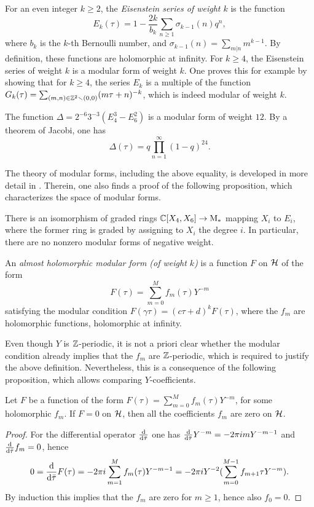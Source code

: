 \begin{expls}
 For an even integer $k\geq 2$, the \emph{Eisenstein series of weight $k$} is the function \[E_k(\tau)=1-\frac{2k}{b_k}\sum_{n\geq 1}\sigma_{k-1}(n)q^n,\] where $b_k$ is the $k$-th Bernoulli number, and $\sigma_{k-1}(n)=\sum_{m|n}m^{k-1}$. By definition, these functions are holomorphic at infinity. For $k\geq 4$, the Eisenstein series of weight $k$ is a modular form of weight $k$. One proves this for example by showing that for $k\geq 4$, the series $E_k$ is a multiple of the function $G_k(\tau)=\sum_{(m,n)\in\mathbb{Z}^2\smallsetminus(0,0)}(m\tau+n)^{-k}$, which is indeed modular of weight $k$.
 
 The function $\Delta=2^{-6}3^{-3}(E_4^3-E_6^2)$ is a modular form of weight $12$. By a theorem of Jacobi, one has \[\Delta(\tau)=q\prod_{n=1}^{\infty}(1-q)^{24}.\]
 
 The theory of modular forms, including the above equality, is developed in more  detail in \cite{Serre1973}. Therein, one also finds a proof of the following proposition, which characterizes the space of modular forms.
\end{expls}

\begin{prop}
 There is an isomorphism of graded rings $\mathbb{C}[X_4, X_6]\to \mathrm{M}_*$ mapping $X_i$ to $E_i$, where the former ring is graded by assigning to $X_i$ the degree $i$. In particular, there are no nonzero modular forms of negative weight.
\end{prop}

\begin{defi}
 An \emph{almost holomorphic modular form (of weight $k$)} is a function $F$ on $\mathcal{H}$ of the form
 \[F(\tau)=\sum_{m=0}^Mf_m(\tau)Y^{-m}\]
 satisfying the modular condition $F(\gamma\tau)=(c\tau+d)^kF(\tau)$, where the $f_m$ are holomorphic functions, holomorphic at infinity.
\end{defi}

Even though $Y$ is $\mathbb{Z}$-periodic, it is not a priori clear whether the modular condition already implies that the $f_m$ are $\mathbb{Z}$-periodic, which is required to justify the above definition. Nevertheless, this is a consequence of the following proposition, which allows comparing $Y$-coefficients.

\begin{prop}
 Let $F$ be a function of the form $F(\tau)=\sum_{m=0}^Mf_m(\tau)Y^{-m}$, for some holomorphic $f_m$. If $F=0$ on $\mathcal{H}$, then all the coefficients $f_m$ are zero on $\mathcal{H}$.
\end{prop}
\begin{proof}
 For the differential operator $\frac{\mathrm{d}}{\mathrm{d}\bar{\tau}}$ one has $\frac{\mathrm{d}}{\mathrm{d}\bar{\tau}}Y^{-m}=-2\pi imY^{-m-1}$ and $\frac{\mathrm{d}}{\mathrm{d}\bar{\tau}}f_m=0$, hence \[0=\frac{\mathrm{d}}{\mathrm{d}\bar{\tau}}F(\tau)=-2\pi i\sum_{m=1}^{M}f_m(\tau)Y^{-m-1}=-2\pi iY^{-2}(\sum_{m=0}^{M-1}f_{m+1}{\tau}Y^{-m}).\]
 By induction this implies that the $f_m$ are zero for $m\geq 1$, hence also $f_0=0$.
\end{proof}

